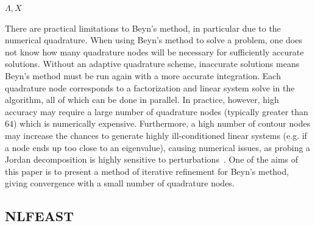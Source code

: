 \documentclass[onefignum,onetabnum]{siamart190516}
\begin{document}
\begin{algorithm}
\caption{Beyn's Method}
\label{alg:beyn}
\begin{algorithmic}
	\RETURN \( \Lambda, X \)
\end{algorithmic}
\end{algorithm}

There are practical limitations to Beyn's method, in particular due to the numerical quadrature. 
When using Beyn's method to solve a problem, one does not know how many quadrature nodes will be necessary for sufficiently accurate solutions.
Without an adaptive quadrature scheme, inaccurate solutions means Beyn's method must be run again with a more accurate integration.
Each quadrature node corresponds to a factorization and linear system solve in the algorithm, all of which can be done in parallel.
In practice, however, high accuracy may require a large number of quadrature nodes (typically greater than $64$) which is numerically expensive.
Furthermore, a high number of contour nodes may increase the chances to generate highly ill-conditioned linear systems (e.g. if a node ends up too close to an eigenvalue), causing numerical issues, as probing a Jordan decomposition is highly sensitive to perturbations~\cite{guttel2017}.
One of the aims of this paper is to present a method of iterative refinement for Beyn's method, giving convergence with a small number of quadrature nodes.


\subsection{NLFEAST}
\end{document}

